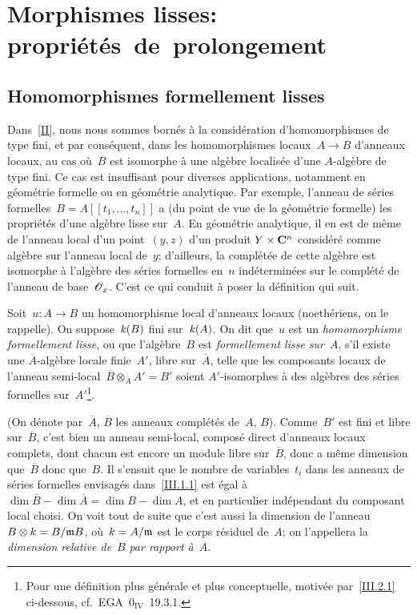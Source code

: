 \chapter{Morphismes lisses: propri\'et\'es~de~prolongement}
\label{III}

\section{Homomorphismes formellement lisses}
\label{III.1}

Dans~\ref{II}, nous nous sommes born\'es \`a la consid\'eration
d'homomorphismes de type fini, et par cons\'equent, dans les
homomorphismes locaux~$A\to B$ d'anneaux locaux, au cas o\`u~$B$ est
isomorphe \`a une alg\`ebre localis\'ee d'une $A$-alg\`ebre de
type fini. Ce cas est insuffisant pour diverses applications,
notamment en g\'eom\'etrie formelle ou en g\'eom\'etrie
analytique. Par exemple, l'anneau de s\'eries
formelles~$B=A[[t_1,\dots,t_n]]$ a (du point de vue de la
g\'eom\'etrie formelle) les propri\'et\'es d'une alg\`ebre
lisse sur~$A$. En g\'eom\'etrie analytique, il en est de m\^eme
de l'anneau local d'un point~$(y,z)$ d'un produit $Y\times\mathbf{C}^n$
consid\'er\'e comme alg\`ebre sur l'anneau local de~$y$;
d'ailleurs, la compl\'et\'ee de cette alg\`ebre est isomorphe
\`a l'alg\`ebre des s\'eries formelles en~$n$
ind\'etermin\'ees sur le compl\'et\'e de l'anneau de
base~$\cal{O}_x$. C'est ce qui conduit \`a poser la d\'efinition
qui suit.

\begin{definition}
\label{III.1.1}
Soit~$u\colon A\to B$ un homomorphisme local d'anneaux locaux
(noeth\'eriens, on le rappelle). On 
suppose~$\mathit{k}(B)$ fini sur~$\mathit{k}(A)$.
On dit que~$u$ est un \emph{homomorphisme
formellement lisse},
ou que l'alg\`ebre~$B$ est \emph{formellement lisse sur}~$A$, s'il
existe une $\overline{A}$-alg\`ebre locale
finie~$A'$,
libre sur~$\overline{A}$, telle que les composants locaux de l'anneau
semi-local~$\overline{B}\otimes_{\overline{A}} A'=B'$ soient
$A'$-isomorphes \`a des alg\`ebres des s\'eries formelles
sur~$A'$\footnote{Pour une d\'efinition plus g\'en\'erale et
plus conceptuelle, motiv\'ee par~\ref{III.2.1} ci-dessous,
cf.\ EGA~$\mathrm{0}_{\mathrm{IV}}$~19.3.1.}.
\end{definition}
(On d\'enote par~$\overline{A}$, $\overline{B}$ les anneaux
compl\'et\'es de~$A$, $B$). Comme~$B'$ est fini et libre
sur~$\overline{B}$, c'est bien un anneau semi-local, compos\'e
direct d'anneaux locaux complets, dont chacun est encore un module
libre sur~$\overline{B}$, donc a m\^eme dimension que~$\overline{B}$
donc que~$B$. Il s'ensuit que le nombre de variables~$t_i$ dans les
anneaux de s\'eries formelles envisag\'es dans~\ref{III.1.1} est
\'egal \`a $\dim \overline{B}-\dim \overline{A}=\dim B-\dim A$, et
en particulier ind\'ependant du composant local
choisi. On voit tout de suite que c'est aussi la dimension de l'anneau
$B\otimes k=B/\mathfrak{m} B$, o\`u~$k=A/\mathfrak{m}$ est le corps
r\'esiduel de~$A$; on l'appellera la \emph{dimension relative
de}~$B$
\emph{par rapport à}~$A$.

